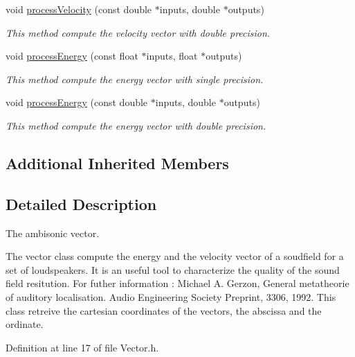 \begin{DoxyCompactItemize}
void \hyperlink{class_hoa2_d_1_1_vector_ab7804e8ec5322fe018141015a8683bd4}{process\-Velocity} (const double $\ast$inputs, double $\ast$outputs)
\begin{DoxyCompactList}\small\item\em This method compute the velocity vector with double precision. \end{DoxyCompactList}\item 
void \hyperlink{class_hoa2_d_1_1_vector_aa24ad96a21db0f508282a8c94a848e1d}{process\-Energy} (const float $\ast$inputs, float $\ast$outputs)
\begin{DoxyCompactList}\small\item\em This method compute the energy vector with single precision. \end{DoxyCompactList}\item 
void \hyperlink{class_hoa2_d_1_1_vector_a6d91bf205b88b88acdc53177e833da59}{process\-Energy} (const double $\ast$inputs, double $\ast$outputs)
\begin{DoxyCompactList}\small\item\em This method compute the energy vector with double precision. \end{DoxyCompactList}\end{DoxyCompactItemize}
\subsection*{Additional Inherited Members}


\subsection{Detailed Description}
The ambisonic vector. 

The vector class compute the energy and the velocity vector of a soudfield for a set of loudspeakers. It is an useful tool to characterize the quality of the sound field resitution. For futher information \-: Michael A. Gerzon, General metatheorie of auditory localisation. Audio Engineering Society Preprint, 3306, 1992. This class retreive the cartesian coordinates of the vectors, the abscissa and the ordinate. 

Definition at line 17 of file Vector.\-h.



